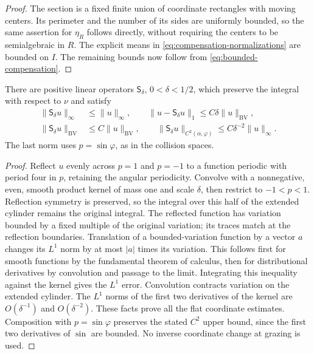 \begin{proof}
The section is a fixed finite union of coordinate rectangles with
moving centers. Its perimeter and the number of its sides are uniformly
bounded, so the same assertion for $\eta_R$ follows directly, without
requiring the centers to be semialgebraic in $R$. The explicit means in
\eqref{eq:compensation-normalizations} are bounded on $I$. The remaining
bounds now follow from \eqref{eq:bounded-compensation}.
\end{proof}

\begin{lemma}\label{lem:bv-smoothing}
There are positive linear operators $\mathsf S_\delta$, $0<\delta<1/2$,
which preserve the integral with respect to $\nu$ and satisfy
\begin{equation}\label{eq:bv-smoothing-bounds}
 \begin{split}
 \|\mathsf S_\delta u\|_\infty&\le\|u\|_\infty,\qquad
 \|u-\mathsf S_\delta u\|_1\le C\delta\|u\|_{\mathrm{BV}},\\
 \|\mathsf S_\delta u\|_{\mathrm{BV}}&\le C\|u\|_{\mathrm{BV}},\qquad
 \|\mathsf S_\delta u\|_{C^2(\alpha,\varphi)}
       \le C\delta^{-2}\|u\|_\infty .
 \end{split}
\end{equation}
The last norm uses $p=\sin\varphi$, as in the collision spaces.
\end{lemma}
\begin{proof}
Reflect $u$ evenly across $p=1$ and $p=-1$ to a function periodic with
period four in $p$, retaining the angular periodicity. Convolve with a
nonnegative, even, smooth product kernel of mass one and scale $\delta$,
then restrict to $-1<p<1$. Reflection symmetry is preserved, so the
integral over this half of the extended cylinder remains the original
integral. The reflected function has variation bounded by a fixed
multiple of the original variation; its traces match at the reflection
boundaries. Translation of a bounded-variation function by a vector $a$
changes its $L^1$ norm by at most $|a|$ times its variation. This follows
first for smooth functions by the fundamental theorem of calculus,
then for distributional derivatives by convolution and passage to the
limit. Integrating this inequality against the kernel gives the $L^1$
error. Convolution contracts variation on the extended cylinder.
The $L^1$ norms of the first two derivatives of the kernel are
$O(\delta^{-1})$ and $O(\delta^{-2})$. These facts prove all the flat
coordinate estimates. Composition with $p=\sin\varphi$ preserves the
stated $C^2$ upper bound, since the first two derivatives of $\sin$
are bounded. No inverse coordinate change at grazing is used.
\end{proof}

